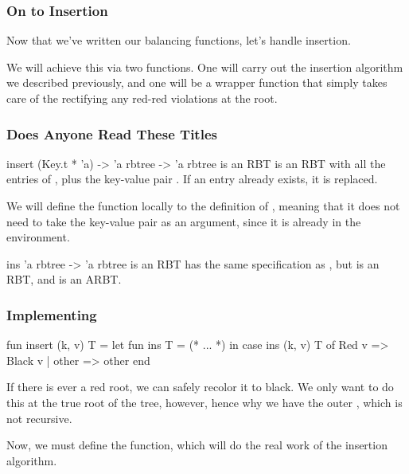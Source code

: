 \documentclass[aspectratio=169]{beamer}
\begin{document}
\begin{frame}[fragile]
  \frametitle{On to Insertion}

  Now that we've written our balancing functions, let's handle insertion.

  \pause
  \vspace{\fill}

  We will achieve this via two functions. One will carry out the
  insertion algorithm we described previously, and one will be a wrapper
  function that simply takes care of the rectifying any red-red violations
  at the root.
\end{frame}



\begin{frame}
  \frametitle{Does Anyone Read These Titles}

  \spec
    {insert}
    {(Key.t * 'a) -> 'a rbtree -> 'a rbtree}
    { is an RBT}
    { is an RBT with all the entries of ,
    plus the key-value pair . If an entry already exists,
    it is replaced.}

  \pause
  \vspace{\fill}

  We will define the  function locally to the definition of
  , meaning that it does not need to take the key-value
  pair as an argument, since it is already in the environment.

  \pause
  \vspace{\fill}

  \spec
    {ins}
    {'a rbtree -> 'a rbtree}
    { is an RBT}
    { has the same specification as , but
     is an RBT, and  is
    an ARBT.}
\end{frame}

\begin{frame}[fragile]
  \frametitle{Implementing }

  \begin{codeblock}
    fun insert (k, v) T =
      let
        fun ins T = (* ... *)
      in
        case ins (k, v) T of
          Red v => Black v
        | other => other
      end
  \end{codeblock}

  \pause
  \vspace{\fill}

  If there is ever a red root, we can safely recolor it to black. We only
  want to do this at the true root of the tree, however, hence why we have the
  outer , which is not recursive.

  \pause
  \vspace{\fill}

  Now, we must define the  function, which will do the real work of
  the insertion algorithm.
\end{frame}
\end{document}
